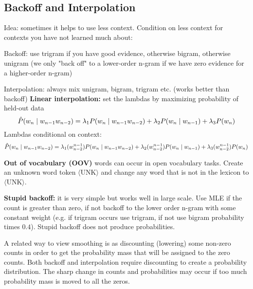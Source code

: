 \documentclass[12pt]{article}
\begin{document}
\subsection{Backoff and Interpolation}
\par Idea: sometimes it helps to use less context. Condition on less context for contexts you have not learned much about:
\ulb
\item Backoff: use trigram if you have good evidence, otherwise bigram, otherwise unigram (we only "back off" to a lower-order n-gram if we have zero evidence for a higher-order n-gram)
\item Interpolation: always mix unigram, bigram, trigram etc. (works better than backoff)
\ule
\textbf{Linear interpolation:} set the lambdas by maximizing probability of held-out data
\[ \hat{P}(w_n\mid w_{n-1}w_{n-2}) = \lambda_1 P(w_n\mid w_{n-1}w_{n-2}) + \lambda_2 P(w_n\mid w_{n-1}) + \lambda_3 P(w_n)\]
Lambdas conditional on context:
\[ \hat{P}(w_n\mid w_{n-1}w_{n-2}) = \lambda_1(w_{n-2}^{n-1}) P(w_n\mid w_{n-1}w_{n-2}) + \lambda_2(w_{n-2}^{n-1}) P(w_n\mid w_{n-1}) + \lambda_3(w_{n-2}^{n-1}) P(w_n)\]
\par \textbf{Out of vocabulary (OOV)} words can occur in open vocabulary tasks. Create an unknown word token $\langle\text{UNK}\rangle$ and change any word that is not in the lexicon to $\langle\text{UNK}\rangle$.
\par \textbf{Stupid backoff:} it is very simple but works well in large scale. Use MLE if the count is greater than zero, if not backoff to the lower order n-gram with some constant weight (e.g. if trigram occurs use trigram, if not use bigram probability times $0.4$). Stupid backoff does not produce probabilities.
\par A related way to view smoothing is as discounting (lowering) some non-zero counts in order to get the probability mass that will be assigned to the zero counts. Both backoff and interpolation require discounting to create a probability distribution. The sharp change in counts and probabilities may occur if too much probability mass is moved to all the zeros.
\end{document}
